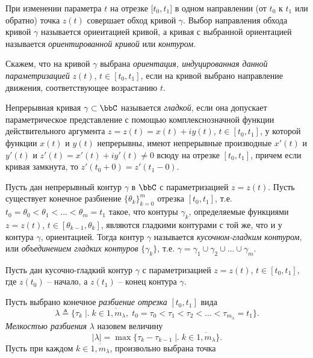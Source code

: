 При изменении параметра $t$ на отрезке $[t_0 , t_1$] в одном направлении (от $t_0$ к $t_1$ или обратно) точка $z(t)$ совершает обход кривой $\gamma$. Выбор направления обхода кривой $\gamma$ называется ориеитацией кривой, а кривая с выбранной ориентацией называется \textit{ориентированной кривой} или \textit{контуром}.

Скажем, что на кривой $\gamma$ выбрана \textit{ориентация, индуцированная данной параметризацией} $z(t)$, $t \in[t_0 , t_1]$, если на кривой выбрано направление движения, соответствующее возрастанию $t$. 

\begin{defn}
Непрерывная кривая $\gamma \subset \bbC$ называется \textit{гладкой}, если она допускает параметрическое представление с помощью комплекснозначной функции действительного аргумента $z = z(t) = x(t) + iy(t)$, $t \in [t_0 , t_1]$, у которой функции $x(t)$ и $y(t)$ непрерывны, имеют непрерывные производные $x'(t)$ и $y'(t)$ и $z'(t) = x'(t) +iy'(t) \ne 0$ всюду на отрезке $[t_0 , t_1]$, причем если кривая замкнута, то $z'(t_0 +0)= z'(t_1 - 0)$.
\end{defn}

\begin{defn}
Пусть дан непрерывный контур $\gamma$ в $\bbC$ с параметризацией $z =z(t)$. Пусть существует конечное разбиение $\{\theta_k\}^m_{k=0}$ отрезка $[t_0 , t_1]$, т.е. $t_0 = \theta_0 < \theta_1 < ... < \theta_m = t_1$ такое, что контуры $\gamma_k$, определяемые функциями $z = z(t)$, $t \in [\theta_{k-1}, \theta_k]$, являются гладкими контурами с той же, что и у контура $\gamma$, ориентацией. Тогда контур $\gamma$ называется \textit{кусочном-гладким контуром}, или \textit{объединением гладких контуров } $\{\gamma_k\}$, т.е. $\gamma = \gamma_1 \cup \gamma_2 \cup\dots \cup\gamma_m$. 
\end{defn}


Пусть дан кусочно-гладкий контур $\gamma$ с параметризацией $z=z(t)$, $t \in[t_0 , t_1]$, где $z(t_0)$ -- начало, а $z(t_1)$ -- конец контура $\gamma$. 

Пусть выбрано конечное \textit{разбиение отрезка} $[t_0, t_1]$ вида
\begin{equation}
\label{exp19}
\lambda \triangleq \{\tau_k\; \bigr|\bigl.\; k \in \overline{1,m_\lambda},\; t_0=\tau_0 < \tau_1 < \tau_2 < \dots < \tau_{m_\lambda} = t_1 \}.
\end{equation}
\textit{Мелкостъю разбиения} $\lambda$ назовем величину
$$
|\lambda| = \max \{\tau_k - \tau_{k-1} \; \bigr|\bigl.\; k \in \overline{1,m_\lambda}\}.
$$
Пусть при каждом $k \in \overline{1,m_\lambda}$, произвольно выбрана точка

